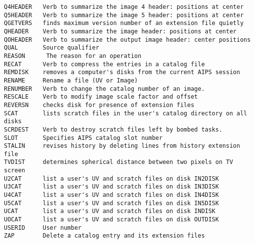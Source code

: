 \begin{verbatim}
Q4HEADER   Verb to summarize the image 4 header: positions at center
Q5HEADER   Verb to summarize the image 5 header: positions at center
QGETVERS   finds maximum version number of an extension file quietly
QHEADER    Verb to summarize the image header: positions at center
QOHEADER   Verb to summarize the output image header: center positions
QUAL       Source qualifier
REASON      The reason for an operation
RECAT      Verb to compress the entries in a catalog file
REMDISK    removes a computer's disks from the current AIPS session
RENAME     Rename a file (UV or Image)
RENUMBER   Verb to change the catalog number of an image.
RESCALE    Verb to modify image scale factor and offset
REVERSN    checks disk for presence of extension files
SCAT       lists scratch files in the user's catalog directory on all disks
SCRDEST    Verb to destroy scratch files left by bombed tasks.
SLOT       Specifies AIPS catalog slot number
STALIN     revises history by deleting lines from history extension file
TVDIST     determines spherical distance between two pixels on TV screen
U2CAT      list a user's UV and scratch files on disk IN2DISK
U3CAT      list a user's UV and scratch files on disk IN3DISK
U4CAT      list a user's UV and scratch files on disk IN4DISK
U5CAT      list a user's UV and scratch files on disk IN5DISK
UCAT       list a user's UV and scratch files on disk INDISK
UOCAT      list a user's UV and scratch files on disk OUTDISK
USERID     User number
ZAP        Delete a catalog entry and its extension files
\end{verbatim}\eve
\vfill\eject


